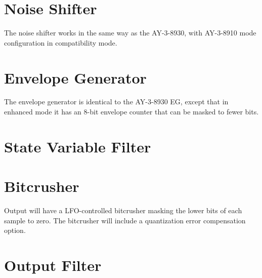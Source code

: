 

\section{Noise Shifter}

The noise shifter works in the same way as the AY-3-8930, with AY-3-8910 mode configuration in compatibility mode.

\section{Envelope Generator}

The envelope generator is identical to the AY-3-8930 EG, except that in enhanced mode it has an 8-bit envelope counter that can be masked to fewer bits.

\section{State Variable Filter}


\section{Bitcrusher}

Output will have a LFO-controlled bitcrusher masking the lower bits of each sample to zero.  The bitcrusher will include a quantization error compensation option.

\section{Output Filter}

